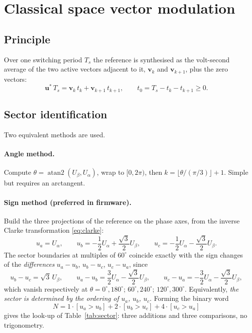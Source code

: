 \documentclass[11pt,a4paper]{article}
\newcommand{\Ts}{T_{s}}
\newcommand{\ualpha}{U_{\alpha}}
\newcommand{\ubeta}{U_{\beta}}
\newcommand{\vs}{\bm{u}^{*}}
\begin{document}
\section{Classical space vector modulation}

\subsection{Principle}

Over one switching period $\Ts$ the reference is synthesised as the volt-second
average of the two active vectors adjacent to it, $\bm{v}_k$ and $\bm{v}_{k+1}$,
plus the zero vectors:
\begin{equation}
\vs\,\Ts = \bm{v}_k\,t_k + \bm{v}_{k+1}\,t_{k+1}, \qquad
t_0 = \Ts - t_k - t_{k+1} \ge 0 .
\label{eq:voltsec}
\end{equation}

\subsection{Sector identification}

Two equivalent methods are used.

\paragraph{Angle method.} Compute $\theta = \operatorname{atan2}(\ubeta,\ualpha)$,
wrap to $[0,2\pi)$, then $k = \lfloor \theta/(\pi/3) \rfloor + 1$. Simple but
requires an arctangent.

\paragraph{Sign method (preferred in firmware).} Build the three projections of the
reference on the phase axes, from the inverse Clarke transformation \eqref{eq:clarke}:
\begin{equation}
u_a = \ualpha, \qquad
u_b = -\frac{1}{2}\ualpha + \frac{\sqrt{3}}{2}\ubeta, \qquad
u_c = -\frac{1}{2}\ualpha - \frac{\sqrt{3}}{2}\ubeta .
\label{eq:invclarke}
\end{equation}
The sector boundaries at multiples of $60^\circ$ coincide exactly with the sign
changes of the \emph{differences} $u_a - u_b$, $u_b - u_c$, $u_c - u_a$, since
\begin{equation}
u_b - u_c = \sqrt{3}\,\ubeta, \qquad
u_a - u_b = \frac{3}{2}\ualpha - \frac{\sqrt{3}}{2}\ubeta, \qquad
u_c - u_a = -\frac{3}{2}\ualpha - \frac{\sqrt{3}}{2}\ubeta ,
\end{equation}
which vanish respectively at $\theta = 0^\circ,180^\circ$; $60^\circ,240^\circ$;
$120^\circ,300^\circ$. Equivalently, \emph{the sector is determined by the ordering of
$u_a$, $u_b$, $u_c$}. Forming the binary word
\begin{equation}
N = 1\cdot[u_a > u_b] + 2\cdot[u_b > u_c] + 4\cdot[u_c > u_a]
\end{equation}
gives the look-up of Table~\ref{tab:sector}: three additions and three comparisons,
no trigonometry.
\end{document}
